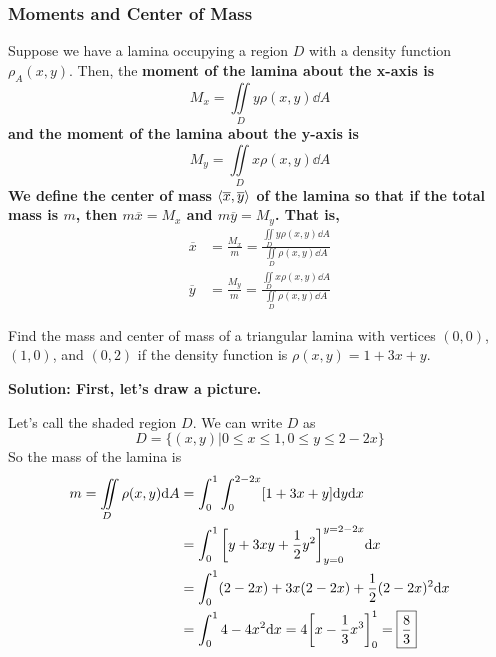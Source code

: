 \subsubsection{Moments and Center of Mass}
Suppose we have a lamina occupying a region \( D \) with a density function \( \rho_A(x,y) \). Then, the \bf{moment} of the lamina about the x-axis is
\[ M_x = \iint\limits_D y\rho(x,y)\dd A\]
and the moment of the lamina about the y-axis is
\[ M_y = \iint\limits_D x\rho(x,y)\dd A \]
We define the center of mass \( \left\langle \overline{x},\overline{y} \right\rangle \) of the lamina so that if the total mass is \( m \), then \( m\overline{x}=M_x \) and \( m\overline{y}=M_y \). That is,
\begin{align*}
    \overline{x} &= \frac{M_x}{m} = \frac{\iint\limits_D y\rho(x,y)\dd A}{\iint\limits_D \rho(x,y)\dd A} \\
    \overline{y} &= \frac{M_y}{m} = \frac{\iint\limits_D x\rho(x,y)\dd A}{\iint\limits_D \rho(x,y)\dd A}
\end{align*}
\begin{example}
    Find the mass and center of mass of a triangular lamina with vertices \( (0,0) \), \( (1,0) \), and \( (0, 2) \) if the density function is \( \rho(x,y) = 1+3x+y \).\par\bf{Solution: }First, let's draw a picture. \par
    \begin{figure}[h!]
        \centering
    \end{figure}
    Let's call the shaded region \( D \). We can write \( D \) as 
    \[ D = \{(x,y)|0\leq x\leq 1, 0\leq y \leq 2-2x\}\]
    So the mass of the lamina is
    \begin{align*}
        m = \iint\limits_D \rho(x,y)\dd A &= \int_0^1\int_0^{2-2x}[1+3x+y]\dd y\dd x \\
        &= \int_0^1 \bqty{y+3xy+\frac{1}{2}y^2}_{y=0}^{y=2-2x}\dd x \\
        &= \int_0^1 (2-2x)+3x(2-2x)+\frac{1}{2}(2-2x)^2\dd x \\
        &= \int_0^1 4-4x^2\dd x = 4\bqty{x-\frac{1}{3}x^3}_0^1 = \boxed{\frac{8}{3}}
    \end{align*}
\end{example}
